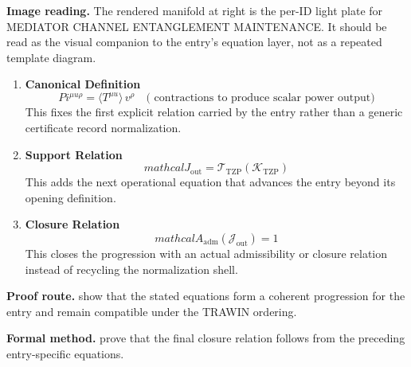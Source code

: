 \begin{samepage}
\noindent\begin{minipage}[t]{0.45\linewidth}
\vspace{0pt}
\raggedright
\scriptsize\textbf{Image reading.} The rendered manifold at right is the per-ID light plate for MEDIATOR CHANNEL ENTANGLEMENT MAINTENANCE. It should be read as the visual companion to the entry's equation layer, not as a repeated template diagram.\par
\end{minipage}\hfill
\begin{minipage}[t]{0.53\linewidth}
\vspace*{-0.10in}
\raggedright
{}
\end{minipage}
\end{samepage}

\clearpage


\begin{enumerate}[leftmargin=1.6em,itemsep=9pt,topsep=6pt]
\item \textbf{Canonical Definition}
\[
Pi^{\mu u\rho} = \langle T^{\mu u}\rangle\, v^\rho\quad\text{( contractions to produce scalar power output)}
\]
This fixes the first explicit relation carried by the entry rather than a generic certificate record normalization.

\item \textbf{Support Relation}
\[
mathcal{J}_{\mathrm{out}} = \mathcal{T}_{\mathrm{TZP}}\!\left(\mathcal{K}_{\mathrm{TZP}}\right)
\]
This adds the next operational equation that advances the entry beyond its opening definition.

\item \textbf{Closure Relation}
\[
mathcal{A}_{\mathrm{adm}}\!\left(\mathcal{J}_{\mathrm{out}}\right)=1
\]
This closes the progression with an actual admissibility or closure relation instead of recycling the normalization shell.
\end{enumerate}

\textbf{Proof route.} show that the stated equations form a coherent progression for the entry and remain compatible under the TRAWIN ordering.

\textbf{Formal method.} prove that the final closure relation follows from the preceding entry-specific equations.

